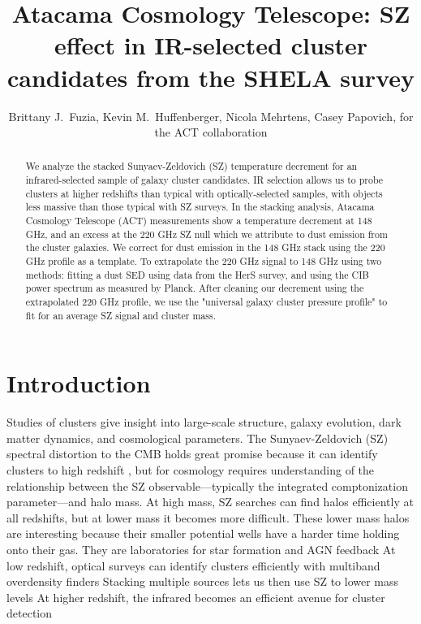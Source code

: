 \documentclass[twocolumn,iop]{emulateapj}
\begin{document}
\title{Atacama Cosmology Telescope: SZ effect in IR-selected cluster candidates from the SHELA survey}

\author{Brittany J.\ Fuzia, Kevin M.\ Huffenberger, Nicola Mehrtens, Casey Papovich, for the ACT collaboration}

\begin{abstract}
We analyze the stacked Sunyaev-Zeldovich (SZ) temperature decrement for an infrared-selected sample of galaxy cluster candidates. IR selection allows us to probe clusters at higher redshifts than typical with optically-selected samples, with objects less massive than those typical with SZ surveys. In the stacking analysis, Atacama Cosmology Telescope (ACT) measurements show a temperature decrement at 148 GHz, and an excess at the 220 GHz SZ null which we attribute to dust emission from the cluster galaxies. We correct for dust emission in the 148 GHz stack using the 220 GHz profile as a template. To extrapolate the 220 GHz signal to 148 GHz using two methods: fitting a dust SED using data from the HerS survey, and using the CIB power spectrum as measured by Planck. After cleaning our decrement using the extrapolated 220 GHz profile, we use the "universal galaxy cluster pressure profile" to fit for an average SZ signal and cluster mass. 
\end{abstract}


\section{Introduction}
Studies of clusters give insight into large-scale structure, galaxy evolution, dark matter dynamics, and cosmological parameters.  The Sunyaev-Zeldovich (SZ) spectral distortion to the CMB holds great promise because it can identify clusters to high redshift \citep{2002ARA&A..40..643C}, but for cosmology requires understanding of the relationship between the SZ observable---typically the integrated comptonization parameter---and halo mass.  At high mass, SZ searches can find halos efficiently at all redshifts, but at lower mass it becomes more difficult.  These lower mass halos are interesting because their smaller potential wells have a harder time holding onto their gas.  They are laboratories for star formation and AGN feedback %
At low redshift, optical surveys can identify clusters efficiently with multiband overdensity finders %
Stacking multiple sources lets us then use SZ to lower mass levels %
At higher redshift, the infrared becomes an efficient avenue for cluster detection %
\end{document}
